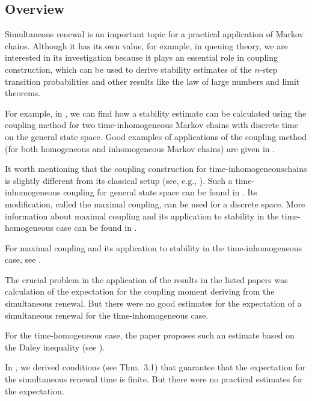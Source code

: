 \documentclass[numbers,compress,v1.0.1]{vmsta}
\theoremstyle{definition}
\begin{document}
\subsection{Overview}
Simultaneous renewal is an important topic for a practical application
of Markov chains. Although it has its own value, for example, in
queuing theory, we are interested in its
investigation because
it plays an essential role in coupling construction, which can be used
to derive stability estimates of the $n$-step transition probabilities
and other results like the law of large numbers and limit theorems.

For example, in \cite{StabilityAndCoupling,MinorCondition}, we can find
how a stability estimate can be calculated using the coupling
method for two time-inhomogeneous Markov chains with discrete time on the
general state space.
Good examples of applications of the coupling method (for both
homogeneous and inhomogeneous Markov chains) are given in \cite{Douc,Douc2}.

It worth mentioning that the coupling construction for
time-inhomogeneous\break chains is slightly different from its classical setup
(see, e.g., \cite{Lindvall,Thorisson}).
Such a time-inhomogeneous coupling for general state space can be found
in \cite{StabilityAndCoupling}.
Its modification, called the maximal coupling, can be used for a
discrete space. More information about maximal coupling and its
application to stability in the time-homogeneous case can be found in
\cite{MaxCoupling1,MaxCoupling2}.

For maximal coupling and its application to stability in the
time-inhomogeneous case, see \cite{MaxCoupling4,MaxCoupling3,WidowPension}.

The crucial problem in the application of the results in the listed
papers was calculation of the expectation for the coupling moment
deriving from the simultaneous renewal.
But there were no good estimates for the expectation of a simultaneous
renewal for the time-inhomogeneous case.

For the time-homogeneous case, the paper \cite{HomogCouplingEstimate}
proposes such an estimate based on the Daley inequality (see \cite{Daley}).


In \cite{Coupling}, we derived conditions (see Thm.\ 3.1) that
guarantee that the expectation for the simultaneous renewal time is
finite. But there were no practical estimates for the expectation.
\end{document}
